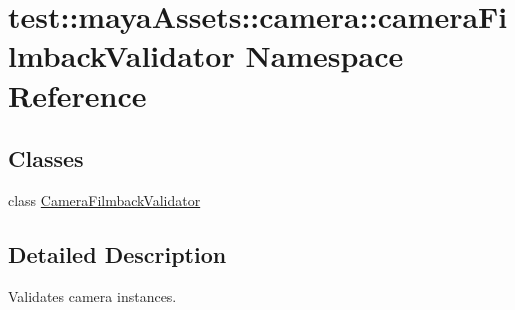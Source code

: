 \hypertarget{namespacetest_1_1mayaAssets_1_1camera_1_1cameraFilmbackValidator}{\section{test\-:\-:maya\-Assets\-:\-:camera\-:\-:camera\-Filmback\-Validator \-Namespace \-Reference}
\label{da/d1c/namespacetest_1_1mayaAssets_1_1camera_1_1cameraFilmbackValidator}
}
\subsection*{\-Classes}
\begin{DoxyCompactItemize}
\item 
class \hyperlink{classtest_1_1mayaAssets_1_1camera_1_1cameraFilmbackValidator_1_1CameraFilmbackValidator}{\-Camera\-Filmback\-Validator}
\end{DoxyCompactItemize}


\subsection{\-Detailed \-Description}
\begin{DoxyVerb}
Validates camera instances.
\end{DoxyVerb}
 